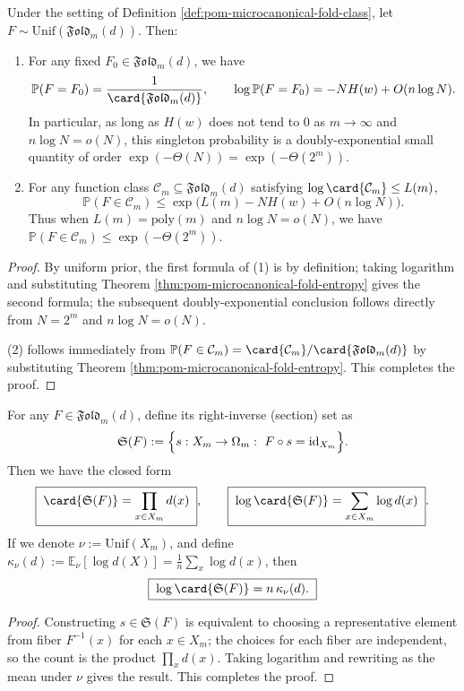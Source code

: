 \begin{corollary}\label{cor:pom-microcanonical-fold-singleton-and-low-complexity-rarity}
Under the setting of Definition \ref{def:pom-microcanonical-fold-class}, let \(F\sim\mathrm{Unif}(\mathfrak{Fold}_m(d))\).
Then:
\begin{enumerate}
  \item For any fixed \(F_0\in\mathfrak{Fold}_m(d)\), we have
  \[
  \mathbb P(F=F_0)=\frac{1}{\card{\mathfrak{Fold}_m(d)}},
  \qquad
  \log\mathbb P(F=F_0)=-N H(w)+O(n\log N).
  \]
  In particular, as long as \(H(w)\) does not tend to \(0\) as \(m\to\infty\) and \(n\log N=o(N)\), this singleton probability is a doubly-exponential small quantity of order \(\exp(-\Theta(N))=\exp(-\Theta(2^m))\).
  \item For any function class \(\mathcal C_m\subseteq\mathfrak{Fold}_m(d)\) satisfying \(\log\card{\mathcal C_m}\le L(m)\),
  \[
  \mathbb P(F\in\mathcal C_m)\le \exp\!\bigl(L(m)-N H(w)+O(n\log N)\bigr).
  \]
  Thus when \(L(m)=\mathrm{poly}(m)\) and \(n\log N=o(N)\), we have \(\mathbb P(F\in\mathcal C_m)\le \exp(-\Theta(2^m))\).
\end{enumerate}
\end{corollary}
\begin{proof}
By uniform prior, the first formula of (1) is by definition; taking logarithm and substituting Theorem \ref{thm:pom-microcanonical-fold-entropy} gives the second formula; the subsequent doubly-exponential conclusion follows directly from \(N=2^m\) and \(n\log N=o(N)\).
\par
(2) follows immediately from \(\mathbb P(F\in\mathcal C_m)=\card{\mathcal C_m}/\card{\mathfrak{Fold}_m(d)}\) by substituting Theorem \ref{thm:pom-microcanonical-fold-entropy}. This completes the proof.
\end{proof}



\begin{theorem}\label{thm:pom-microcanonical-section-count}
For any \(F\in\mathfrak{Fold}_m(d)\), define its right-inverse (section) set as
\[
\mathfrak{S}(F):=\Bigl\{s:X_m\to \Omega_m:\ F\circ s=\mathrm{id}_{X_m}\Bigr\}.
\]
Then we have the closed form
\[
\boxed{\;
\card{\mathfrak{S}(F)}=\prod_{x\in X_m} d(x)\; } ,
\qquad
\boxed{\;
\log\card{\mathfrak{S}(F)}=\sum_{x\in X_m}\log d(x)\; } .
\]
If we denote \(\nu:=\mathrm{Unif}(X_m)\), and define
\(
\kappa_\nu(d):=\mathbb{E}_{\nu}[\log d(X)]=\frac{1}{n}\sum_x\log d(x)
\), then
\[
\boxed{\;
\log\card{\mathfrak{S}(F)}=n\,\kappa_\nu(d).\;}
\]
\end{theorem}
\begin{proof}
Constructing \(s\in\mathfrak{S}(F)\) is equivalent to choosing a representative element from fiber \(F^{-1}(x)\) for each \(x\in X_m\); the choices for each fiber are independent, so the count is the product \(\prod_x d(x)\).
Taking logarithm and rewriting as the mean under \(\nu\) gives the result. This completes the proof.
\end{proof}

